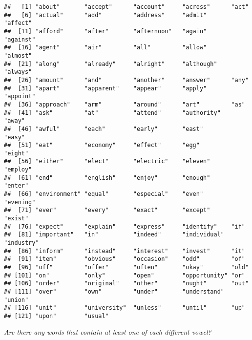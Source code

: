 \documentclass[]{article}
\theoremstyle{definition}
\theoremstyle{definition}
\theoremstyle{definition}
\theoremstyle{remark}
\begin{document}
\begin{verbatim}
##   [1] "about"       "accept"      "account"     "across"      "act"        
##   [6] "actual"      "add"         "address"     "admit"       "affect"     
##  [11] "afford"      "after"       "afternoon"   "again"       "against"    
##  [16] "agent"       "air"         "all"         "allow"       "almost"     
##  [21] "along"       "already"     "alright"     "although"    "always"     
##  [26] "amount"      "and"         "another"     "answer"      "any"        
##  [31] "apart"       "apparent"    "appear"      "apply"       "appoint"    
##  [36] "approach"    "arm"         "around"      "art"         "as"         
##  [41] "ask"         "at"          "attend"      "authority"   "away"       
##  [46] "awful"       "each"        "early"       "east"        "easy"       
##  [51] "eat"         "economy"     "effect"      "egg"         "eight"      
##  [56] "either"      "elect"       "electric"    "eleven"      "employ"     
##  [61] "end"         "english"     "enjoy"       "enough"      "enter"      
##  [66] "environment" "equal"       "especial"    "even"        "evening"    
##  [71] "ever"        "every"       "exact"       "except"      "exist"      
##  [76] "expect"      "explain"     "express"     "identify"    "if"         
##  [81] "important"   "in"          "indeed"      "individual"  "industry"   
##  [86] "inform"      "instead"     "interest"    "invest"      "it"         
##  [91] "item"        "obvious"     "occasion"    "odd"         "of"         
##  [96] "off"         "offer"       "often"       "okay"        "old"        
## [101] "on"          "only"        "open"        "opportunity" "or"         
## [106] "order"       "original"    "other"       "ought"       "out"        
## [111] "over"        "own"         "under"       "understand"  "union"      
## [116] "unit"        "university"  "unless"      "until"       "up"         
## [121] "upon"        "usual"
\end{verbatim}

\emph{Are there any words that contain at least one of each different
vowel?}
\end{document}
